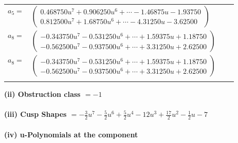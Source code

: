 \documentclass[1p]{elsarticle_modified}
\theoremstyle{definition}
\begin{document}
\begin{tabular}{m{7pt} m{180pt} m{7pt} m{180pt} }
\flushright $a_{5}=$&$\begin{pmatrix}0.468750 u^{7}+0.906250 u^{6}+\cdots-1.46875 u-1.93750\\0.812500 u^{7}+1.68750 u^{6}+\cdots-4.31250 u-3.62500\end{pmatrix}$ \\
\flushright $a_{8}=$&$\begin{pmatrix}-0.343750 u^{7}-0.531250 u^{6}+\cdots+1.59375 u+1.18750\\-0.562500 u^{7}-0.937500 u^{6}+\cdots+3.31250 u+2.62500\end{pmatrix}$\\ \flushright $a_{8}=$&$\begin{pmatrix}-0.343750 u^{7}-0.531250 u^{6}+\cdots+1.59375 u+1.18750\\-0.562500 u^{7}-0.937500 u^{6}+\cdots+3.31250 u+2.62500\end{pmatrix}$\\&\end{tabular}
\flushleft \textbf{(ii) Obstruction class $= -1$}\\~\\
\flushleft \textbf{(iii) Cusp Shapes $= -\frac{3}{2} u^7-\frac{5}{2} u^6+\frac{5}{2} u^4-12 u^3+\frac{17}{2} u^2-\frac{1}{2} u-7$}\\~\\
\newpage\renewcommand{\arraystretch}{1}
\flushleft \textbf{(iv) u-Polynomials at the component}\newline \\
\end{document}
